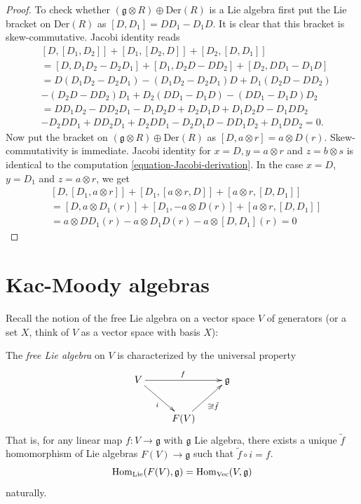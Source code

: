 \begin{proof}
\medskip\noindent
To check whether $(\mathfrak{g}\otimes R)\oplus\text{Der}(R)$ is a Lie algebra 
first put the Lie bracket on $\text{Der}(R)$ as
$[D,D_1]=DD_1-D_1D$. It is clear that this bracket is skew-commutative. 
Jacobi identity reads
\begin{align*}
&[D,[D_1,D_2]]+[D_1,[D_2,D]]+[D_2,[D,D_1]]\\
&=[D,D_1D_2-D_2D_1]+[D_1,D_2D-DD_2]+[D_2,DD_1-D_1D]\\
&=D(D_1D_2-D_2D_1)-(D_1D_2-D_2D_1)D+D_1(D_2D-DD_2)\\
&-(D_2D-DD_2)D_1+D_2(DD_1-D_1D)-(DD_1-D_1D)D_2\\
&=DD_1D_2-DD_2D_1-D_1D_2D+D_2D_1D+D_1D_2D-D_1DD_2\\
&-D_2DD_1+DD_2D_1+D_2DD_1-D_2D_1D-DD_1D_2+D_1DD_2=0.
\end{align*}
Now put the bracket on $(\mathfrak{g} \otimes  R)\oplus\text{Der}(R)$ as
$[D,a \otimes  r]=a \otimes D(r)$. Skew-commutativity is immediate. 
Jacobi identity for $x=D,y=a\otimes r$ and $z=b\otimes s$ is identical to the
computation \ref{equation-Jacobi-derivation}. In the case
$x=D$, $y=D_1$ and $z=a\otimes r$, we get
\begin{align*}
&[D,[D_1,a\otimes r]]+[D_1,[a\otimes r,D]]+[a\otimes r,[D,D_1]]\\
&=[D,a\otimes D_1(r)]+[D_1,-a\otimes D(r)]+[a\otimes r,[D,D_1]]\\
&=a\otimes DD_1(r)-a\otimes D_1D(r)-a\otimes [D,D_1](r)=0
\end{align*}
\end{proof}

\section{Kac-Moody algebras}
\label{section-Kac-Moody-algebras}

Recall the notion of the free Lie algebra on a 
vector space $V$ of generators 
(or a set $X$, think of $V$ as a vector space with basis $X$):

\begin{definition}
\label{definition-free-Lie-algebra}
The {\it free Lie algebra} on $V$ is characterized by the universal property
$$
\xymatrix{
V\ar[rr]^f\ar[dr]_i&&\mathfrak{g}\\
& F(V)\ar[ur]_{\exists !\tilde{f}}
}
$$
That is, for any linear map $f:V \to \mathfrak{g}$ with $\mathfrak{g}$ Lie
algebra, there exists a unique $\tilde{f}$ homomorphism of Lie algebras 
$F(V)\to \mathfrak{g}$ such that $\tilde{f} \circ i=f$.
$$
\mathop{\mathrm{Hom}}\nolimits_{\text{Lie}}(F(V),\mathfrak{g})=\mathop{\mathrm{Hom}}\nolimits_{\text{Vec}}(V,\mathfrak{g})
$$
naturally.
\end{definition}

